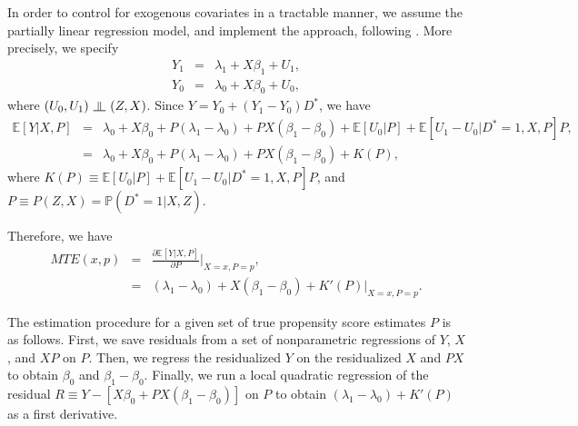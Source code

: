 \documentclass[11pt,reqno]{amsart}
\newcommand{\indep}{\rotatebox[origin=c]{90}{$\models$}}
\theoremstyle{plain}
\numberwithin{equation}{section}
\begin{document}
In order to control for exogenous covariates in a tractable manner, we assume the partially linear regression model, and implement the \cite{robinson1988} approach, following \cite{Carneiroal2017}. More precisely, we specify
\begin{eqnarray*}
	Y_1 &=& \lambda_1 + X \beta_1 + U_1, \\
	Y_0 &=& \lambda_0 + X \beta_0 + U_0,
\end{eqnarray*}
where $(U_0,U_1)\ \indep\ (Z,X)$. Since $Y=Y_0+(Y_1-Y_0)D^*$, we have
\begin{eqnarray*}
	\mathbb{E}[Y \vert X, P] &=& \lambda_0 + X \beta_0 + P (\lambda_1 - \lambda_0) + PX(\beta_1 - \beta_0) + \mathbb E[U_0\vert P] + \mathbb{E}[U_1 - U_0 \vert D^*=1, X, P]P, \\
	&=& \lambda_0 + X \beta_0 + P (\lambda_1 - \lambda_0) + PX(\beta_1 - \beta_0) + K(P),
\end{eqnarray*}
where $K(P)\equiv \mathbb E[U_0\vert P] + \mathbb{E}[U_1 - U_0 \vert D^*=1, X, P]P$, and $P\equiv P(Z,X)=\mathbb P(D^*=1\vert X, Z)$.

Therefore, we have 
\begin{eqnarray*}
	MTE(x, p) &=& \frac{\partial \mathbb{E}[Y \vert X, P] }{\partial P} \bigg\vert _{X=x, P=p}, \\
	&=&  (\lambda_1 - \lambda_0) + X(\beta_1 - \beta_0) + K'(P) \Big\vert _{X=x, P=p}.
\end{eqnarray*}


The estimation procedure for a given set of true propensity score estimates $P$ is as follows. First, we save residuals from a set of nonparametric regressions of $Y$, $X$, and $XP$ on $P$.
Then, we regress the residualized $Y$ on the residualized $X$ and $PX$ to obtain $\beta_0$ and $\beta_1 - \beta_0$.
Finally, we run a local quadratic regression of the residual $R\equiv Y - [X \beta_0 + PX(\beta_1 - \beta_0)]$ on $P$ to obtain $(\lambda_1 - \lambda_0) + K'(P)$ as a first derivative.
\end{document}
